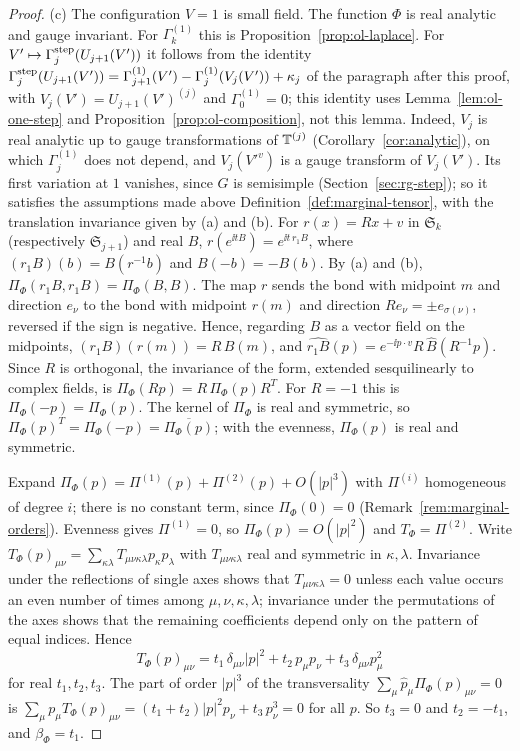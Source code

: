 \begin{proof}
(c) The configuration $V=1$ is small field. The function $\Phi$ is real analytic and gauge invariant. For $\Gamma^{(1)}_k$ this is Proposition~\ref{prop:ol-laplace}. For $V'\mapsto\Gamma^{\rm step}_j(U_{j+1}(V'))$ it follows from the identity $\Gamma^{\rm step}_j(U_{j+1}(V'))=\Gamma^{(1)}_{j+1}(V')-\Gamma^{(1)}_j(V_j(V'))+\kappa_j$ of the paragraph after this proof, with $V_j(V')=U_{j+1}(V')^{(j)}$ and $\Gamma^{(1)}_0=0$; this identity uses Lemma~\ref{lem:ol-one-step} and Proposition~\ref{prop:ol-composition}, not this lemma. Indeed, $V_j$ is real analytic up to gauge transformations of $\mathbb T^{(j)}$ (Corollary~\ref{cor:analytic}), on which $\Gamma^{(1)}_j$ does not depend, and $V_j(V'^{v})$ is a gauge transform of $V_j(V')$. Its first variation at $1$ vanishes, since $G$ is semisimple (Section~\ref{sec:rg-step}); so it satisfies the assumptions made above Definition~\ref{def:marginal-tensor}, with the translation invariance given by (a) and (b). For $r(x)=Rx+v$ in $\mathfrak S_k$ (respectively $\mathfrak S_{j+1}$) and real $B$, $r(e^{\ii tB})=e^{\ii t\,r_1B}$, where $(r_1B)(b)=B(r^{-1}b)$ and $B(-b)=-B(b)$. By (a) and (b), $\Pi_\Phi(r_1B,r_1B)=\Pi_\Phi(B,B)$. The map $r$ sends the bond with midpoint $m$ and direction $e_\nu$ to the bond with midpoint $r(m)$ and direction $Re_\nu=\pm e_{\sigma(\nu)}$, reversed if the sign is negative. Hence, regarding $B$ as a vector field on the midpoints, $(r_1B)(r(m))=R\,B(m)$, and $\widehat{r_1B}(p)=e^{-\ii p\cdot v}R\,\hat B(R^{-1}p)$. Since $R$ is orthogonal, the invariance of the form, extended sesquilinearly to complex fields, is $\Pi_\Phi(Rp)=R\,\Pi_\Phi(p)R^T$. For $R=-1$ this is $\Pi_\Phi(-p)=\Pi_\Phi(p)$. The kernel of $\Pi_\Phi$ is real and symmetric, so $\Pi_\Phi(p)^T=\Pi_\Phi(-p)=\overline{\Pi_\Phi(p)}$; with the evenness, $\Pi_\Phi(p)$ is real and symmetric.

Expand $\Pi_\Phi(p)=\Pi^{(1)}(p)+\Pi^{(2)}(p)+O(|p|^3)$ with $\Pi^{(i)}$ homogeneous of degree $i$; there is no constant term, since $\Pi_\Phi(0)=0$ (Remark~\ref{rem:marginal-orders}). Evenness gives $\Pi^{(1)}=0$, so $\Pi_\Phi(p)=O(|p|^2)$ and $T_\Phi=\Pi^{(2)}$. Write $T_\Phi(p)_{\mu\nu}=\sum_{\kappa\lambda}T_{\mu\nu\kappa\lambda}p_\kappa p_\lambda$ with $T_{\mu\nu\kappa\lambda}$ real and symmetric in $\kappa,\lambda$. Invariance under the reflections of single axes shows that $T_{\mu\nu\kappa\lambda}=0$ unless each value occurs an even number of times among $\mu,\nu,\kappa,\lambda$; invariance under the permutations of the axes shows that the remaining coefficients depend only on the pattern of equal indices. Hence
\[
T_\Phi(p)_{\mu\nu}=t_1\,\delta_{\mu\nu}|p|^2+t_2\,p_\mu p_\nu+t_3\,\delta_{\mu\nu}p_\mu^2
\]
for real $t_1,t_2,t_3$. The part of order $|p|^3$ of the transversality $\sum_\mu\hat p_\mu\Pi_\Phi(p)_{\mu\nu}=0$ is $\sum_\mu p_\mu T_\Phi(p)_{\mu\nu}=(t_1+t_2)|p|^2p_\nu+t_3\,p_\nu^3=0$ for all $p$. So $t_3=0$ and $t_2=-t_1$, and $\beta_\Phi=t_1$.
\end{proof}

